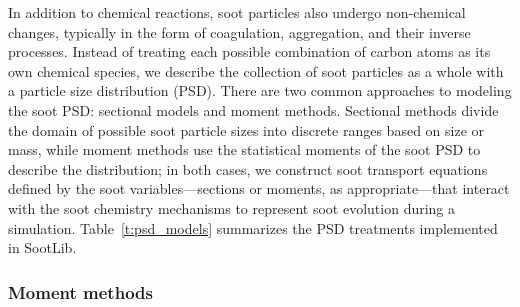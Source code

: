\documentclass[preprint,letterpaper]{elsarticle}
\begin{document}
In addition to chemical reactions, soot particles also undergo non-chemical changes, typically in the form of coagulation, aggregation, and their inverse processes. Instead of treating each possible combination of carbon atoms as its own chemical species, we describe the collection of soot particles as a whole with a particle size distribution (PSD). There are two common approaches to modeling the soot PSD: sectional models and moment methods. Sectional methods divide the domain of possible soot particle sizes into discrete ranges based on size or mass, while moment methods use the statistical moments of the soot PSD to describe the distribution; in both cases, we construct soot transport equations defined by the soot variables---sections or moments, as appropriate---that interact with the soot chemistry mechanisms to represent soot evolution during a simulation. Table~\ref{t:psd_models} summarizes the PSD treatments implemented in SootLib.
%
\begin{table}
    \caption{Summary of soot particle size distribution models implemented in SootLib.}
    \label{t:psd_models}
    \centering
\end{table}
%

\subsubsection{Moment methods}
\label{s:moment-methods}
\end{document}
